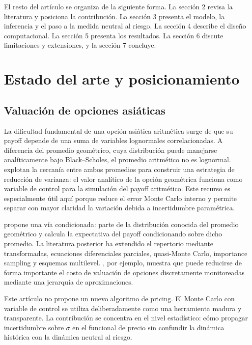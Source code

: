 El resto del artículo se organiza de la siguiente forma. La sección 2 revisa la literatura y posiciona la contribución. La sección 3 presenta el modelo, la inferencia y el paso a la medida neutral al riesgo. La sección 4 describe el diseño computacional. La sección 5 presenta los resultados. La sección 6 discute limitaciones y extensiones, y la sección 7 concluye.

\section{Estado del arte y posicionamiento}

\subsection{Valuación de opciones asiáticas}

La dificultad fundamental de una opción asiática aritmética surge de que su payoff depende de una suma de variables lognormales correlacionadas. A diferencia del promedio geométrico, cuya distribución puede manejarse analíticamente bajo Black--Scholes, el promedio aritmético no es lognormal. \citet{kemnavorst1990} explotan la cercanía entre ambos promedios para construir una estrategia de reducción de varianza: el valor analítico de la opción geométrica funciona como variable de control para la simulación del payoff aritmético. Este recurso es especialmente útil aquí porque reduce el error Monte Carlo interno y permite separar con mayor claridad la variación debida a incertidumbre paramétrica.

\citet{curran1994} propone una vía condicionada: parte de la distribución conocida del promedio geométrico y calcula la expectativa del payoff condicionando sobre dicho promedio. La literatura posterior ha extendido el repertorio mediante transformadas, ecuaciones diferenciales parciales, quasi-Monte Carlo, importance sampling y esquemas multilevel. \citet{kahale2020}, por ejemplo, muestra que puede reducirse de forma importante el costo de valuación de opciones discretamente monitoreadas mediante una jerarquía de aproximaciones.

Este artículo no propone un nuevo algoritmo de pricing. El Monte Carlo con variable de control se utiliza deliberadamente como una herramienta madura y transparente. La contribución se concentra en el nivel estadístico: cómo propagar incertidumbre sobre $\sigma$ en el funcional de precio sin confundir la dinámica histórica con la dinámica neutral al riesgo.

